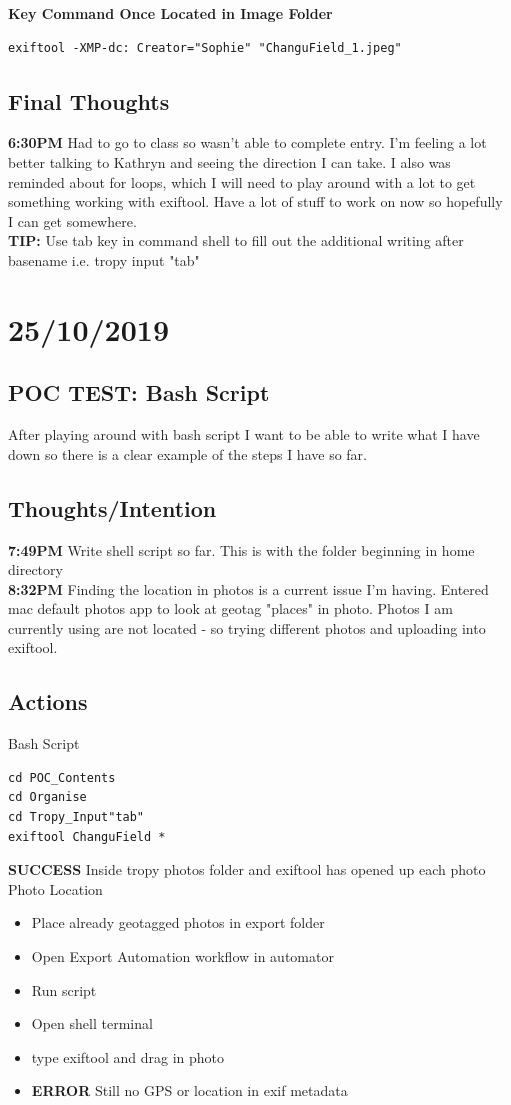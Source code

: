 \documentclass{article}
\begin{document}
\textbf{Key Command Once Located in Image Folder}
\begin{verbatim}
exiftool -XMP-dc: Creator="Sophie" "ChanguField_1.jpeg"
\end{verbatim}

\subsection{Final Thoughts}
\textbf{6:30PM} Had to go to class so wasn't able to complete entry. I'm feeling a lot better talking to Kathryn and seeing the direction I can take. I also was reminded about for loops, which I will need to play around with a lot to get something working with exiftool. Have a lot of stuff to work on now so hopefully I can get somewhere.  \\
\textbf{TIP:} Use tab key in command shell to fill out the additional writing after basename i.e. tropy input "tab"

\section{25/10/2019}
\subsection{POC TEST: Bash Script}
After playing around with bash script I want to be able to write what I have down so there is a clear example of the steps I have so far.
\subsection{Thoughts/Intention}
\textbf{7:49PM} Write shell script so far. This is with the folder beginning in home directory \\
\textbf{8:32PM} Finding the location in photos is a current issue I'm having. Entered mac default photos app to look at geotag "places" in photo. Photos I am currently using are not located - so trying different photos and uploading into exiftool.

\subsection{Actions}
Bash Script
\begin{verbatim}
cd POC_Contents
cd Organise
cd Tropy_Input"tab"
exiftool ChanguField *
\end{verbatim}
\textbf{SUCCESS} Inside tropy photos folder and exiftool has opened up each photo \\
Photo Location
\begin{itemize}
\item Place already geotagged photos in export folder
\item Open Export Automation workflow in automator
\item Run script
\item Open shell terminal
\item type exiftool and drag in photo
\item \textbf{ERROR} Still no GPS or location in exif metadata
\end{itemize}
\end{document}

